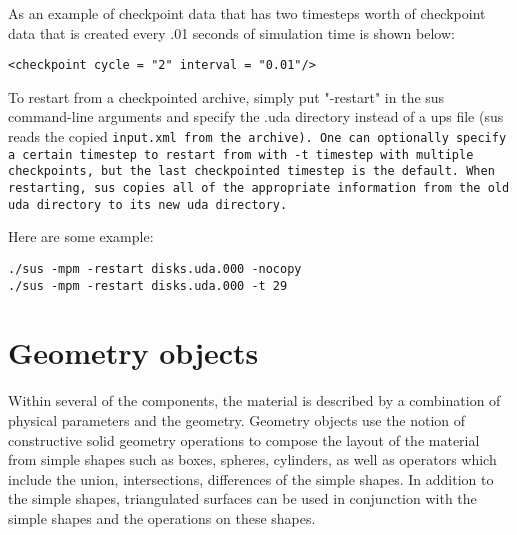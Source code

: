 As an example of checkpoint data that has two timesteps worth of
checkpoint data that is created every .01 seconds of simulation time
is shown below:

\begin{Verbatim}[fontsize=\footnotesize]
<checkpoint cycle = "2" interval = "0.01"/>
\end{Verbatim}


To restart from a checkpointed archive, simply put "-restart" in the
sus command-line arguments and specify the .uda directory instead of
a ups file (sus reads the copied \tt input.xml \normalfont from the
archive).  One can optionally specify a certain timestep to restart
from with \tt -t timestep \normalfont with multiple checkpoints, but the
last checkpointed timestep is the default.  When restarting, sus
copies all of the appropriate information from the old uda directory to its
new uda directory.

Here are some example:

\begin{Verbatim}[fontsize=\footnotesize]
./sus -mpm -restart disks.uda.000 -nocopy
./sus -mpm -restart disks.uda.000 -t 29
\end{Verbatim}
%
\section{Geometry objects} \label{Sec:GeometryObjects}

Within several of the components, the material is described by a
combination of physical parameters and the geometry.  Geometry objects
use the notion of constructive solid geometry operations to compose
the layout of the material from simple shapes such as boxes, spheres,
cylinders, as well as operators which include the union,
intersections, differences of the simple shapes.  In addition to the
simple shapes, triangulated surfaces can be used in conjunction with
the simple shapes and the operations on these shapes.


